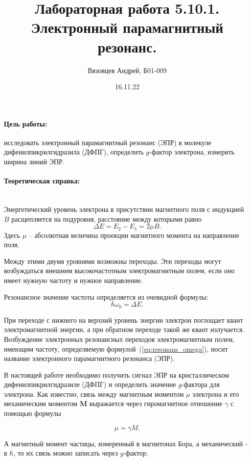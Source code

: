 \documentclass[a4paper, 12pt]{article}
\author{Вязовцев Андрей, Б01-009}
\date{16.11.22}
\title{Лабораторная работа 5.10.1. Электронный парамагнитный резонанс.}
\newcommand{\parag}[1]{\paragraph*{#1:}}
\begin{document}
\maketitle

\parag {Цель работы} исследовать электронный парамагнитный резонанс (ЭПР) в молекуле дифенилпикрилгидразила (ДФПГ), определить $g$-фактор электрона, измерить ширина линий ЭПР.



\parag {Теоретическая справка} ~\\

Энергетический уровень электрона в присутствии магнитного поля с индукцией $B$ расщепляется на подуровня, расстояние между которыми равно 
\begin{equation}
    \label{eq:dE}
    \Delta E = E_2 - E_1 = 2\mu B.
\end{equation}
Здесь $\mu$ -- абсолютная величина проекции магнитного момента на направление поля.

Между этими двумя уровнями возможны переходы. Эти переходы могут возбуждаться внешним высокочастотным электромагнитным полем, если оно имеет нужную частоту и нужное направление.

Резонансное значение частоты определяется из очевидной формулы:
\begin{equation}
    \label{eq:resonans_omega}
    \hbar \omega_0 = \Delta E.
\end{equation}

При переходе с нижнего на верхний уровень энергии электрон поглощает квант электромагнитной энергии, а при обратном переходе такой же квант излучается. Возбуждение электронных резонансных переходов электромагнитным полем, имеющим частоту, определяемую формулой~(\ref{eq:resonans_omega}), носит название электронного парамагнитного резонанса (ЭПР).

В настоящей работе необходимо получить сигнал ЭПР на кристаллическом дифенилпикрилгидразиле (ДФПГ) и определить значение $g$-фактора для электрона. Как известно, связь между магнитным моментом $\mu$ электрона и его механическим моментом $\mathbf{M}$ выражается через гиромагнитное отношение $\gamma$ с помощью формулы

\begin{equation}
    \label{eq:gyromagnit}
    \mu = \gamma M.
\end{equation}

А магнитный момент частицы, измеренный в магнитонах Бора, а механический - в $\hbar$, то их связь можно записать через $g$-фактор:
\end{document}
